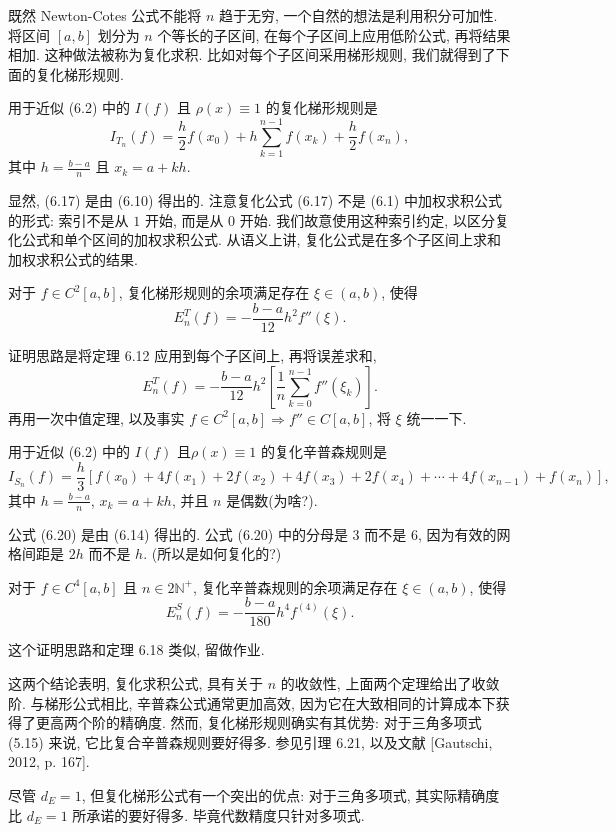 \documentclass[a4paper]{ctexart}
\newcommand{\hl}[1]
{\noindent {\bf {#1}}}
\begin{document}
既然 Newton-Cotes 公式不能将 $n$ 趋于无穷, 一个自然的想法是利用积分可加性. 
将区间 $[a, b]$ 划分为 $n$ 个等长的子区间, 在每个子区间上应用低阶公式, 再将结果相加. 这种做法被称为复化求积. 
比如对每个子区间采用梯形规则, 我们就得到了下面的复化梯形规则.

\hl{定义6.17} 用于近似 (6.2) 中的 $I(f)$ 且 $\rho(x) \equiv 1$ 的复化梯形规则是
$$
I_{T_n}(f) = \frac{h}{2} f(x_0) + h \sum_{k=1}^{n-1} f(x_k) + \frac{h}{2} f(x_n), 
$$
其中 $h = \frac{b - a}{n}$ 且 $x_k = a + kh$.

显然, (6.17) 是由 (6.10) 得出的. 注意复化公式 (6.17) 不是 (6.1) 中加权求积公式的形式: 
索引不是从 $1$ 开始, 而是从 $0$ 开始. 我们故意使用这种索引约定, 以区分复化公式和单个区间的加权求积公式. 
从语义上讲, 复化公式是在多个子区间上求和加权求积公式的结果. 

\hl{定理6.18} 对于 $f \in C^2[a, b]$, 复化梯形规则的余项满足存在 $\xi \in (a, b)$, 使得
$$ 
E^T_n(f) = -\frac{b - a}{12}h^2 f''(\xi). 
$$

证明思路是将定理 6.12 应用到每个子区间上, 再将误差求和, 
$$
E^T_n(f) = -\frac{b - a}{12}h^2 \left[ \frac{1}{n} \sum_{k=0}^{n-1} f''(\xi_k) \right]. 
$$
再用一次中值定理, 以及事实 $f \in C^2[a, b] \Rightarrow f'' \in C[a, b]$, 
将 $\xi$ 统一一下.

\hl{定义6.19} 用于近似 (6.2) 中的 $I(f)$ 且$\rho(x) \equiv 1$ 的复化辛普森规则是
$$ 
I_{S_n}(f) 
= \frac{h}{3} \left[ f(x_0) + 4f(x_1) + 2f(x_2) + 4f(x_3) + 2f(x_4) 
+ \cdots + 4f(x_{n-1}) + f(x_n) \right], 
$$
其中 $h = \frac{b - a}{n}$, $x_k = a + kh$, 并且 $n$ 是偶数(为啥?).

公式 (6.20) 是由 (6.14) 得出的. 公式 (6.20) 中的分母是 $3$ 而不是 $6$, 
因为有效的网格间距是 $2h$ 而不是 $h$. (所以是如何复化的?)

\hl{定理6.20} 对于 $f \in C^4[a, b]$ 且 $n \in 2\mathbb{N}^+$, 
复化辛普森规则的余项满足存在 $\xi \in (a, b)$, 使得
$$ 
E^S_n(f) = -\frac{b - a}{180}h^4 f^{(4)}(\xi). 
$$

这个证明思路和定理 6.18 类似, 留做作业. 

这两个结论表明, 复化求积公式, 具有关于 $n$ 的收敛性, 上面两个定理给出了收敛阶.
与梯形公式相比, 辛普森公式通常更加高效, 因为它在大致相同的计算成本下获得了更高两个阶的精确度. 
然而, 复化梯形规则确实有其优势: 对于三角多项式 (5.15) 来说, 它比复合辛普森规则要好得多. 
参见引理 6.21, 以及文献 [Gautschi, 2012, p. 167].

尽管 $d_E = 1$, 但复化梯形公式有一个突出的优点: 对于三角多项式, 其实际精确度比 $d_E = 1$ 
所承诺的要好得多. 毕竟代数精度只针对多项式.
\end{document}
